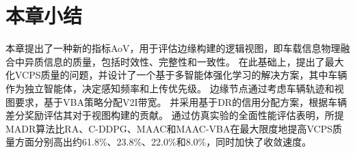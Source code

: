 \section{本章小结}\label{section 3-6}

本章提出了一种新的指标AoV，用于评估边缘构建的逻辑视图，即车载信息物理融合中异质信息的质量，包括时效性、完整性和一致性。
在此基础上，提出了最大化VCPS质量的问题，并设计了一个基于多智能体强化学习的解决方案，其中车辆作为独立智能体，决定感知频率和上传优先级。
边缘节点通过考虑车辆轨迹和视图要求，基于VBA策略分配V2I带宽。
并采用基于DR的信用分配方案，根据车辆差分奖励评估其对于视图构建的贡献。
通过仿真实验的全面性能评估表明，所提MADR算法比RA、C-DDPG、MAAC和MAAC-VBA在最大限度地提高VCPS质量方面分别高出约61.8\%、23.8\%、22.0\%和8.0\%，同时加快了收敛速度。

